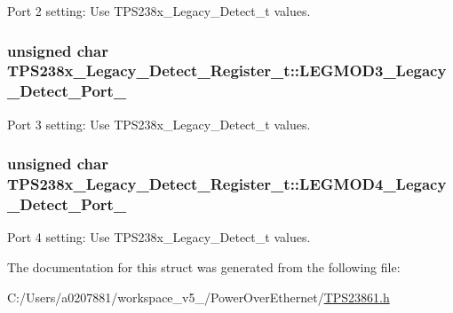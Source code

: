 Port 2 setting\-: Use T\-P\-S238x\-\_\-\-Legacy\-\_\-\-Detect\-\_\-t values. 

\hypertarget{struct_t_p_s238x___legacy___detect___register__t_a6b80e1e553d2a514fa74657eb4336b7c}{
\subsubsection[{L\-E\-G\-M\-O\-D3\-\_\-\-Legacy\-\_\-\-Detect\-\_\-\-Port\-\_\-3}]{\setlength{\rightskip}{0pt plus 5cm}unsigned char T\-P\-S238x\-\_\-\-Legacy\-\_\-\-Detect\-\_\-\-Register\-\_\-t\-::\-L\-E\-G\-M\-O\-D3\-\_\-\-Legacy\-\_\-\-Detect\-\_\-\-Port\-\_}}\label{struct_t_p_s238x___legacy___detect___register__t_a6b80e1e553d2a514fa74657eb4336b7c}


Port 3 setting\-: Use T\-P\-S238x\-\_\-\-Legacy\-\_\-\-Detect\-\_\-t values. 

\hypertarget{struct_t_p_s238x___legacy___detect___register__t_a8413d8a277d91edc53da8b44c7ea6691}{
\subsubsection[{L\-E\-G\-M\-O\-D4\-\_\-\-Legacy\-\_\-\-Detect\-\_\-\-Port\-\_\-4}]{\setlength{\rightskip}{0pt plus 5cm}unsigned char T\-P\-S238x\-\_\-\-Legacy\-\_\-\-Detect\-\_\-\-Register\-\_\-t\-::\-L\-E\-G\-M\-O\-D4\-\_\-\-Legacy\-\_\-\-Detect\-\_\-\-Port\-\_}}\label{struct_t_p_s238x___legacy___detect___register__t_a8413d8a277d91edc53da8b44c7ea6691}


Port 4 setting\-: Use T\-P\-S238x\-\_\-\-Legacy\-\_\-\-Detect\-\_\-t values. 



The documentation for this struct was generated from the following file\-:\begin{DoxyCompactItemize}
\item 
C\-:/\-Users/a0207881/workspace\-\_\-v5\-\_/\-Power\-Over\-Ethernet/\hyperlink{_t_p_s23861_8h}{T\-P\-S23861.\-h}\end{DoxyCompactItemize}
